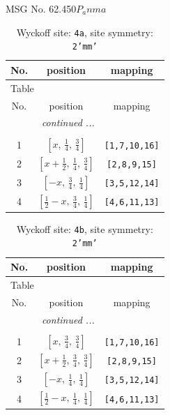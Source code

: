 \documentclass[fleqn,8pt]{jsarticle}
\begin{document}
\setcounter{MaxMatrixCols}{32}

\renewcommand{\tablename}{Table~}
\renewcommand{\figurename}{Figure~}
\begin{center}
\LARGE
MSG No. 62.450\quad$P_{a}nma$
\end{center}
\renewcommand{\arraystretch}{1.2}
\begin{longtable}{ccc}
\caption{Wyckoff site: {\tt 4a}, site symmetry: {\tt 2'mm'}}
 \\
 \hline \hline
No. & position & mapping \\ \hline \endfirsthead

\multicolumn{2}{l}{\tablename\ \thetable{}} \\
 \hline \hline
No. & position & mapping \\ \hline \endhead

 \hline \hline
\multicolumn{2}{r}{\footnotesize\it continued ...} \\ \endfoot

 \hline \hline
\multicolumn{2}{r}{} \\ \endlastfoot

1 & $\left[ x,\, \frac{1}{4},\, \frac{3}{4} \right]$ & {\tt [1,7,10,16]} \\ \hline
2 & $\left[ x + \frac{1}{2},\, \frac{1}{4},\, \frac{3}{4} \right]$ & {\tt [2,8,9,15]} \\ \hline
3 & $\left[ - x,\, \frac{3}{4},\, \frac{1}{4} \right]$ & {\tt [3,5,12,14]} \\ \hline
4 & $\left[ \frac{1}{2} - x,\, \frac{3}{4},\, \frac{1}{4} \right]$ & {\tt [4,6,11,13]} \\
\end{longtable}
\renewcommand{\arraystretch}{1.2}
\begin{longtable}{ccc}
\caption{Wyckoff site: {\tt 4b}, site symmetry: {\tt 2'mm'}}
 \\
 \hline \hline
No. & position & mapping \\ \hline \endfirsthead

\multicolumn{2}{l}{\tablename\ \thetable{}} \\
 \hline \hline
No. & position & mapping \\ \hline \endhead

 \hline \hline
\multicolumn{2}{r}{\footnotesize\it continued ...} \\ \endfoot

 \hline \hline
\multicolumn{2}{r}{} \\ \endlastfoot

1 & $\left[ x,\, \frac{3}{4},\, \frac{3}{4} \right]$ & {\tt [1,7,10,16]} \\ \hline
2 & $\left[ x + \frac{1}{2},\, \frac{3}{4},\, \frac{3}{4} \right]$ & {\tt [2,8,9,15]} \\ \hline
3 & $\left[ - x,\, \frac{1}{4},\, \frac{1}{4} \right]$ & {\tt [3,5,12,14]} \\ \hline
4 & $\left[ \frac{1}{2} - x,\, \frac{1}{4},\, \frac{1}{4} \right]$ & {\tt [4,6,11,13]} \\
\end{longtable}
\end{document}

